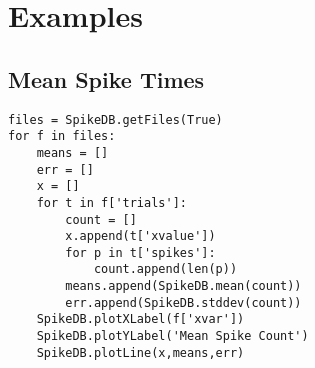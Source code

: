 \documentclass{report}
\begin{document}
\section{Examples}
\subsection{Mean Spike Times}
\begin{lstlisting}[label=codeMean,caption=Calculating the mean spike counts.]
files = SpikeDB.getFiles(True)
for f in files:
	means = []
	err = []
	x = []
	for t in f['trials']:
		count = []
		x.append(t['xvalue'])	
		for p in t['spikes']:
			count.append(len(p))
		means.append(SpikeDB.mean(count))
		err.append(SpikeDB.stddev(count))
	SpikeDB.plotXLabel(f['xvar'])
	SpikeDB.plotYLabel('Mean Spike Count')
	SpikeDB.plotLine(x,means,err)
\end{lstlisting}
\end{document}
